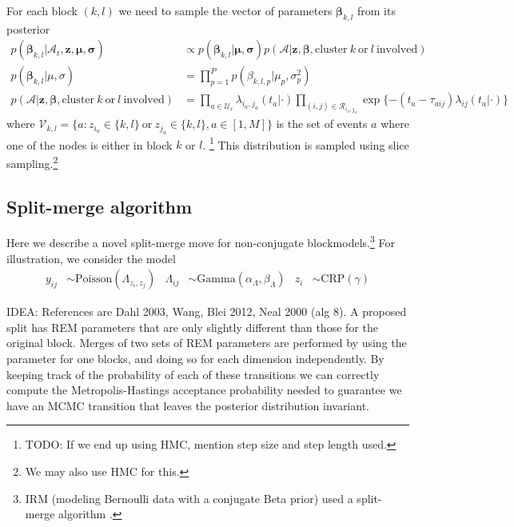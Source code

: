 \documentclass{article}
\begin{document}
For each block $(k,l)$ we need to sample the vector of parameters $\boldsymbol{\beta}_{k,l}$ from its posterior
\begin{align*}
p(\boldsymbol{\beta}_{k,l} | \mathcal{A}_t, \textbf{z}, \boldsymbol{\mu}, \boldsymbol{\sigma}) &\propto p(\boldsymbol{\beta}_{k,l} | \boldsymbol{\mu}, \boldsymbol{\sigma}) p( \mathcal{A}| \textbf{z}, \boldsymbol{\beta}, \mbox{cluster} \ k \ \mbox{or} \ l \ \mbox{involved}) \\  
p(\boldsymbol{\beta}_{k,l} | \mu, \sigma) &= \prod_{p=1}^Pp(\beta_{k,l,p}|\mu_p,\sigma_p^2)\\
p(\mathcal{A}|\mathbf{z},\boldsymbol{\beta}, \mbox{cluster} \ k \ \mbox{or} \ l \ \mbox{involved}) &= \prod_{a \in \mathcal{U}_r} \lambda_{i_a,j_a}(t_a|\cdot)
\prod_{(i,j) \in \mathcal{R}_{i_a,j_a}} \exp \{ -(t_a - \tau_{aij}) \lambda_{ij}(t_a|\cdot)\}
\end{align*}
where $\mathcal{V}_{k,l} = \{a: z_{i_a} \in \{k,l\} \ \mbox{or} \ z_{j_a} \in \{k,l\}, a \in [1,M]\}$ is the set of events $a$ where one of the nodes is either in block $k$ or $l$.  \footnote{TODO: If we end up using HMC, mention step size and step length used.}
This distribution is sampled using slice sampling.\footnote{We may also use HMC for this.}

\subsection{Split-merge algorithm}


Here we describe a novel split-merge move for non-conjugate blockmodels.\footnote{IRM (modeling Bernoulli data with a conjugate Beta prior) used a split-merge algorithm \cite{Kempe2006}.}  For illustration, we consider the model
\begin{align*}
  y_{ij} & \sim \mbox{Poisson}(\Lambda_{z_i,z_j}) & \Lambda_{ij} &\sim \mbox{Gamma}(\alpha_{\Lambda},\beta_{\Lambda})  & z_i &\sim \mbox{CRP}(\gamma)
\end{align*}

IDEA: References are Dahl 2003, Wang, Blei 2012, Neal 2000 (alg 8).  A proposed split has REM parameters that are only slightly different than those for the original block.  Merges of two sets of REM parameters are performed by using the parameter for one blocks, and doing so for each dimension independently.  By keeping track of the probability of each of these transitions we can correctly compute the Metropolis-Hastings acceptance probability needed to guarantee we have an MCMC transition that leaves the posterior distribution invariant.
\end{document}
